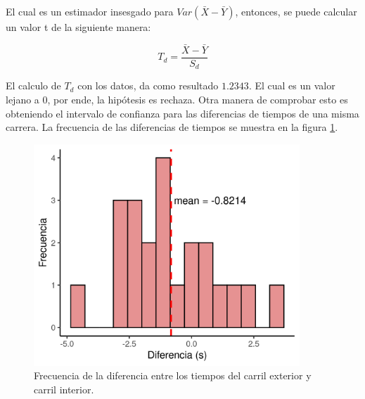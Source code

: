 El cual es un estimador insesgado para $Var(\bar{X}-\bar{Y})$, entonces, se puede calcular un valor t de la siguiente manera:

\begin{equation*}
	T_d = \frac{\bar{X}-\bar{Y}}{S_d}
\end{equation*}

El calculo de $T_d$ con los datos, da como resultado $1.2343$. El cual es un valor lejano a 0, por ende, la hipótesis es rechaza. Otra manera de comprobar esto es obteniendo el intervalo de confianza para las diferencias de tiempos de una misma carrera. La frecuencia de las diferencias de tiempos se muestra en la figura \ref{fig:problema07_histogram}.
\begin{figure}[H]
	\centering
	\includegraphics[width=10cm]{Graphics/problema07_histogram.png}
	\caption{Frecuencia de la diferencia entre los tiempos del carril exterior y carril interior.}
	\label{fig:problema07_histogram}
\end{figure}
